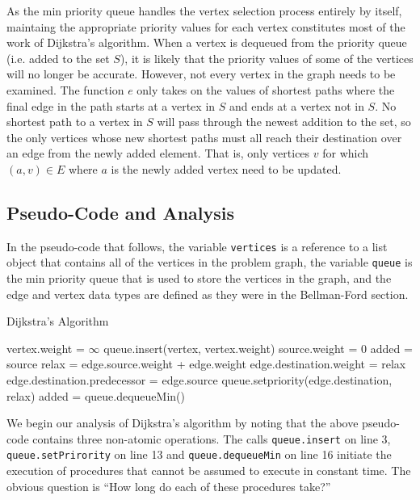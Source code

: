 \documentclass[12pt,twoside]{reedthesis}
\newcommand{\procedure}[1]{{\tt#1}}
\newcommand{\var}[1]{{\mbox{\tt#1}}}
\begin{document}
As the min priority queue handles the vertex selection process entirely by itself, maintaing the appropriate priority values for each vertex constitutes most of the work of Dijkstra's algorithm. When a vertex is dequeued from the priority queue (i.e. added to the set $S$), it is likely that the priority values of some of the vertices will no longer be accurate. However, not every vertex in the graph needs to be examined. The function $e$ only takes on the values of shortest paths where the final edge in the path starts at a vertex in $S$ and ends at a vertex not in $S$. No shortest path to a vertex in $S$ will pass through the newest addition to the set, so the only vertices whose new shortest paths must all reach their destination over an edge from the newly added element. That is, only vertices $v$ for which $(a,v) \in E$ where $a$ is the newly added vertex need to be updated.

\subsection{Pseudo-Code and Analysis}

In the pseudo-code that follows, the variable \var{vertices} is a reference to a list object that contains all of the vertices in the problem graph, the variable \var{queue} is the min priority queue that is used to store the vertices in the graph, and the edge and vertex data types are defined as they were in the Bellman-Ford section. 

\begin{algorithm}[h!]
\caption{Dijkstra's Algorithm}
\label{dijkstrapseudo}
\begin{algorithmic}[1]
\STATE vertex.weight = $\infty$
\STATE queue.insert(vertex, vertex.weight)
\ENDFOR
\STATE source.weight = 0
\STATE added = source
\STATE relax = edge.source.weight + edge.weight
\STATE edge.destination.weight = relax
\STATE edge.destination.predecessor = edge.source
\STATE queue.setpriority(edge.destination, relax)
\ENDIF
\ENDFOR
\STATE added = queue.dequeueMin()
\ENDWHILE
\end{algorithmic}
\end{algorithm}

We begin our analysis of Dijkstra's algorithm by noting that the above pseudo-code contains three non-atomic operations. The calls \procedure{queue.insert} on line 3, \procedure{queue.setPrirority} on line 13 and \procedure{queue.dequeueMin} on line 16 initiate the execution of procedures that cannot be assumed to execute in constant time. The obvious question is ``How long do each of these procedures take?''
\end{document}
